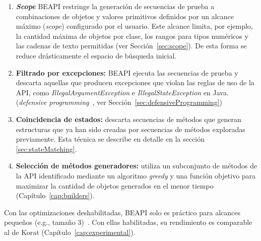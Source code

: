 \begin{enumerate}
    \item \textbf{\emph{Scope}} \textsf{BEAPI} restringe
      la generación de secuencias de prueba a combinaciones de objetos y valores primitivos
      definidos por un alcance máximo (\emph{scope}) configurado por el usuario. 
      Este alcance limita, por ejemplo, la cantidad máxima de objetos por clase, 
      los rangos para tipos numéricos y las cadenas de texto permitidas 
      (ver Sección~\ref{sec:scope}). De esta forma se reduce drásticamente 
      el espacio de búsqueda inicial.
    \item \textbf{Filtrado por excepciones:} \textsf{BEAPI} ejecuta las secuencias de prueba y descarta
      aquellas que producen excepciones que violan las reglas de uso de la API, como
      \emph{IllegalArgumentException} e \emph{IllegalStateException} en Java.
      (\emph{defensive programming}~\cite{Liskov00}, ver Sección~\ref{sec:defensiveProgramming})
    \item \textbf{Coincidencia de estados:} descarta secuencias de métodos que generan estructuras que ya han sido creadas por 
      secuencias de métodos exploradas previamente. Esta técnica se describe en detalle en la sección \ref{sec:stateMatching}.
    \item \textbf{Selección de métodos generadores:} utiliza un subconjunto 
      de métodos de la API identificado mediante un algoritmo \emph{greedy} y 
      una función objetivo para maximizar la cantidad de objetos generados 
      en el menor tiempo (Capítulo~\ref{cap:builders}).
\end{enumerate}

Con las optimizaciones deshabilitadas, \textsf{BEAPI} solo es práctico para 
alcances pequeños (e.g., tamaño 3)~\cite{Politano20}. Con ellas habilitadas, 
su rendimiento es comparable al de \textsf{Korat} (Capítulo~\ref{cap:experimental}).






